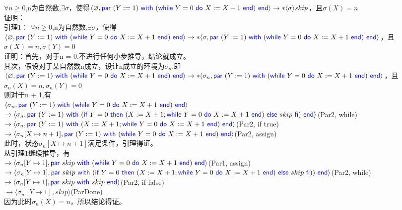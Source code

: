 \documentclass[11pt,a4paper]{article}
\let\emptyset\varnothing
\newcommand{\pair}[1]{\langle #1 \rangle}
\newcommand{\kword}[1]{{\color{blue} \textsf{#1}}}
\newcommand{\If}{\kword{if}}
\newcommand{\Then}{\kword{then}}
\newcommand{\Else}{\kword{else}}
\newcommand{\Fi}{\kword{fi}}
\newcommand{\While}{\kword{while}}
\newcommand{\Do}{\kword{do}}
\newcommand{\End}{\kword{end}}
\newcommand{\Par}{\kword{par}}
\newcommand{\With}{\kword{with}}
\begin{document}
\begin{solution}
    $\forall n \geq 0$,n为自然数,$\exists \sigma$，使得$\pair{\emptyset, \Par~(Y:=1)~\With~(\While~Y=0~\Do~X:=X+1~\End)~\End} \to* \pair{\sigma}{skip}$，且$\sigma(X) = n$\\
    证明：\\
    引理1：    $\forall n \geq 0$,n为自然数,$\exists \sigma$，使得\\$\pair{\emptyset, \Par~(Y:=1)~\With~(\While~Y=0~\Do~X:=X+1~\End)~\End} \\ \to* \pair{\sigma,\Par~(Y:=1)~\With~(\While~Y=0~\Do~X:=X+1~\End)~\End}$，且\\$\sigma(X) = n, \sigma(Y) = 0$\\
    证明：首先，对于n = 0,不进行任何小步推导，结论就成立。\\
    其次，假设对于某自然数n成立，设让n成立的环境为$\sigma_n$,即\\$\pair{\emptyset,\Par~(Y:=1)~\With~(\While~Y=0~\Do~X:=X+1~\End)~\End} \\ \to* \pair{\sigma_n,\Par~(Y:=1)~\With~(\While~Y=0~\Do~X:=X+1~\End)~\End}$，且\\$\sigma_n(X) = n, \sigma_n(Y) = 0$\\
    则对于n + 1,有
    \\$\pair{\sigma_n,\Par~(Y:=1)~\With~(\While~Y=0~\Do~X:=X+1~\End)~\End}$
    \\ $\to \pair{\sigma_n,\Par~(Y:=1)~\With~(\If~Y=0~ \Then~(X:=X+1;\While~Y=0~\Do~X:=X+1~\End)~ \Else~skip~\Fi)~\End}$(Par2, while)
        \\ $\to \pair{\sigma_n,\Par~(Y:=1)~\With~(X:=X+1;\While~Y=0~\Do~X:=X+1~\End)~\End}$(Par2, if true)
                \\ $\to \pair{\sigma_n[X \mapsto n+1],\Par~(Y:=1)~\With~(\While~Y=0~\Do~X:=X+1~\End)~\End}$(Par2, assign)\\
                此时，状态$\sigma_n[X \mapsto n+1]$满足条件，引理得证。\\
     从引理1继续推导，有\\
     $\to \pair{\sigma_n[Y \mapsto 1],\Par~skip~\With~(\While~Y=0~\Do~X:=X+1~\End)~\End}$(Par1, assign)\\
     $\to \pair{\sigma_n[Y \mapsto 1],\Par~skip~\With~(\If~Y=0~ \Then~(X:=X+1;\While~Y=0~\Do~X:=X+1~\End)~ \Else~skip~\Fi))~\End}$(Par2, while)\\
     $\to\pair{\sigma_n[Y \mapsto 1],\Par~skip~\With~skip~\End}$(Par2, if false)\\
     $\to\pair{\sigma_n[Y \mapsto 1],skip}$(ParDone)\\
     因为此时$\sigma_n(X) = n$，所以结论得证。
                
\end{solution}
\end{document}
